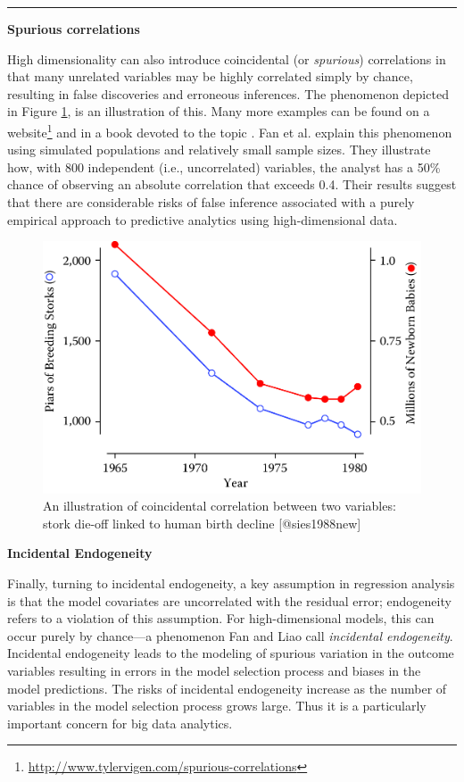 \documentclass[]{krantz}
\begin{document}
\begin{center}\rule{0.5\linewidth}{\linethickness}\end{center}

\textbf{Spurious correlations}

High dimensionality can also introduce coincidental (or \emph{spurious})
correlations in that many unrelated variables may be highly correlated
simply by chance, resulting in false discoveries and erroneous
inferences. The phenomenon depicted in Figure \ref{fig:fig10-3}, is an
illustration of this. Many more examples can be found on a
website\footnote{\url{http://www.tylervigen.com/spurious-correlations}}
and in a book devoted to the topic \citep{spurious2}. Fan et al.
\citeyearpar{fan2014challenges} explain this phenomenon using simulated
populations and relatively small sample sizes. They illustrate how, with
800 independent (i.e., uncorrelated) variables, the analyst has a 50\%
chance of observing an absolute correlation that exceeds 0.4. Their
results suggest that there are considerable risks of false inference
associated with a purely empirical approach to predictive analytics
using high-dimensional data.

\begin{figure}

{\centering \includegraphics[width=0.7\linewidth]{ChapterError/figures/fig10-3} 

}

\caption{An illustration of coincidental correlation between two variables: stork die-off linked to human birth decline [@sies1988new]}\label{fig:fig10-3}
\end{figure}

\textbf{Incidental Endogeneity}

Finally, turning to incidental endogeneity, a key assumption in
regression analysis is that the model covariates are uncorrelated with
the residual error; endogeneity refers to a violation of this
assumption. For high-dimensional models, this can occur purely by
chance---a phenomenon Fan and Liao \citeyearpar{fan2014endogeneity} call
\emph{incidental endogeneity}. Incidental endogeneity leads to the
modeling of spurious variation in the outcome variables resulting in
errors in the model selection process and biases in the model
predictions. The risks of incidental endogeneity increase as the number
of variables in the model selection process grows large. Thus it is a
particularly important concern for big data analytics.
\end{document}
